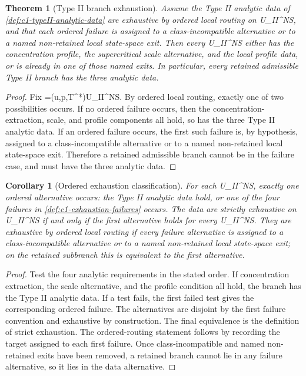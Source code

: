 \documentclass[11pt]{amsart}
\def\({}%
\def\){}%
\def\mathrm#1{#1}%
\theoremstyle{plain}
\newtheorem{theorem}{Theorem}[section]
\newtheorem{corollary}[corollary]{Corollary}
\theoremstyle{definition}
\theoremstyle{remark}
\begin{document}
\begin{theorem}[Type II branch exhaustion]
\label{thm:c1-typeII-branch-exhaustion}
Assume the Type II analytic data of \cref{def:c1-typeII-analytic-data} are
exhaustive by ordered local routing on \(\mathcal U_{\mathrm{II}}^{NS}\), and
that each ordered failure is assigned to a class-incompatible alternative or to
a named non-retained local state-space exit.  Then every
\(\omega\in\mathcal U_{\mathrm{II}}^{NS}\) either has the concentration
profile, the supercritical scale alternative, and the local profile data, or is
already in one of those named exits.  In particular, every retained admissible
Type II branch has the three analytic data.
\end{theorem}

\begin{proof}
Fix \(\omega=(u,p,T^*)\in\mathcal U_{\mathrm{II}}^{NS}\).  By ordered local
routing, exactly one of two possibilities occurs.  If no ordered failure occurs,
then the concentration-extraction, scale, and profile components all hold, so
\(\omega\) has the three Type II analytic data.  If an ordered failure occurs,
the first such failure is, by hypothesis, assigned to a class-incompatible
alternative or to a named non-retained local state-space exit.  Therefore a
retained admissible branch cannot be in the failure case, and must have the
three analytic data.
\end{proof}

\begin{corollary}[Ordered exhaustion classification]
\label{cor:c1-ordered-exhaustion}
For each \(\omega\in\mathcal U_{\mathrm{II}}^{NS}\), exactly one ordered
alternative occurs: the Type II analytic data hold, or one of the four failures
in \cref{def:c1-exhaustion-failures} occurs.  The data are strictly exhaustive
on \(\mathcal U_{\mathrm{II}}^{NS}\) if and only if the first alternative holds
for every \(\omega\in\mathcal U_{\mathrm{II}}^{NS}\).  They are exhaustive by
ordered local routing if every failure alternative is assigned to a
class-incompatible alternative or to a named non-retained local state-space
exit; on the retained subbranch this is equivalent to the first alternative.
\end{corollary}

\begin{proof}
Test the four analytic requirements in the stated order.  If concentration
extraction, the scale alternative, and the profile condition all hold, the
branch has the Type II analytic data.  If a test fails, the first failed test gives the
corresponding ordered failure.  The alternatives are disjoint by the first
failure convention and exhaustive by construction.  The final equivalence is
the definition of strict exhaustion.  The ordered-routing statement follows by
recording the target assigned to each first failure.  Once class-incompatible
and named non-retained exits have been removed, a retained branch cannot lie in
any failure alternative, so it lies in the data alternative.
\end{proof}
\end{document}

